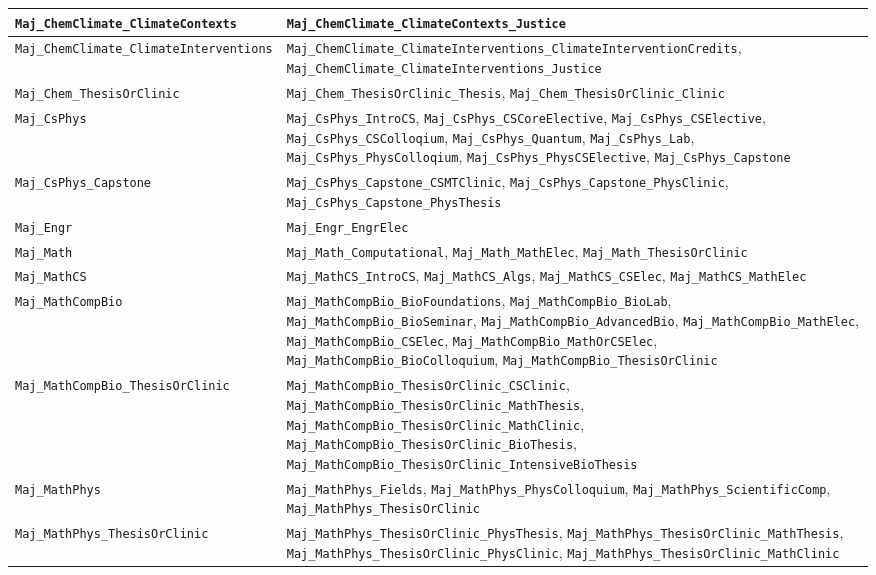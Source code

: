 \begin{longtable}{|p{4.4in}|p{4.4in}|}
    \verb|Maj_ChemClimate_ClimateContexts| & \verb|Maj_ChemClimate_ClimateContexts_Justice|\\\hline
    \verb|Maj_ChemClimate_ClimateInterventions| & \verb|Maj_ChemClimate_ClimateInterventions_ClimateInterventionCredits|, \verb|Maj_ChemClimate_ClimateInterventions_Justice|\\\hline
    \verb|Maj_Chem_ThesisOrClinic| & \verb|Maj_Chem_ThesisOrClinic_Thesis|, \verb|Maj_Chem_ThesisOrClinic_Clinic|\\\hline
    \verb|Maj_CsPhys| & \verb|Maj_CsPhys_IntroCS|, \verb|Maj_CsPhys_CSCoreElective|, \verb|Maj_CsPhys_CSElective|, \verb|Maj_CsPhys_CSColloqium|, \verb|Maj_CsPhys_Quantum|, \verb|Maj_CsPhys_Lab|, \verb|Maj_CsPhys_PhysColloqium|, \verb|Maj_CsPhys_PhysCSElective|, \verb|Maj_CsPhys_Capstone|\\\hline
    \verb|Maj_CsPhys_Capstone| & \verb|Maj_CsPhys_Capstone_CSMTClinic|, \verb|Maj_CsPhys_Capstone_PhysClinic|, \verb|Maj_CsPhys_Capstone_PhysThesis|\\\hline
    \verb|Maj_Engr| & \verb|Maj_Engr_EngrElec|\\\hline
    \verb|Maj_Math| & \verb|Maj_Math_Computational|, \verb|Maj_Math_MathElec|, \verb|Maj_Math_ThesisOrClinic|\\\hline
    \verb|Maj_MathCS| & \verb|Maj_MathCS_IntroCS|, \verb|Maj_MathCS_Algs|, \verb|Maj_MathCS_CSElec|, \verb|Maj_MathCS_MathElec|\\\hline
    \verb|Maj_MathCompBio| & \verb|Maj_MathCompBio_BioFoundations|, \verb|Maj_MathCompBio_BioLab|, \verb|Maj_MathCompBio_BioSeminar|, \verb|Maj_MathCompBio_AdvancedBio|, \verb|Maj_MathCompBio_MathElec|, \verb|Maj_MathCompBio_CSElec|, \verb|Maj_MathCompBio_MathOrCSElec|, \verb|Maj_MathCompBio_BioColloquium|, \verb|Maj_MathCompBio_ThesisOrClinic|\\\hline
    \verb|Maj_MathCompBio_ThesisOrClinic| & \verb|Maj_MathCompBio_ThesisOrClinic_CSClinic|, \verb|Maj_MathCompBio_ThesisOrClinic_MathThesis|, \verb|Maj_MathCompBio_ThesisOrClinic_MathClinic|, \verb|Maj_MathCompBio_ThesisOrClinic_BioThesis|, \verb|Maj_MathCompBio_ThesisOrClinic_IntensiveBioThesis|\\\hline
    \verb|Maj_MathPhys| & \verb|Maj_MathPhys_Fields|, \verb|Maj_MathPhys_PhysColloquium|, \verb|Maj_MathPhys_ScientificComp|, \verb|Maj_MathPhys_ThesisOrClinic|\\\hline
    \verb|Maj_MathPhys_ThesisOrClinic| & \verb|Maj_MathPhys_ThesisOrClinic_PhysThesis|, \verb|Maj_MathPhys_ThesisOrClinic_MathThesis|, \verb|Maj_MathPhys_ThesisOrClinic_PhysClinic|, \verb|Maj_MathPhys_ThesisOrClinic_MathClinic|\\\hline

\end{longtable}
